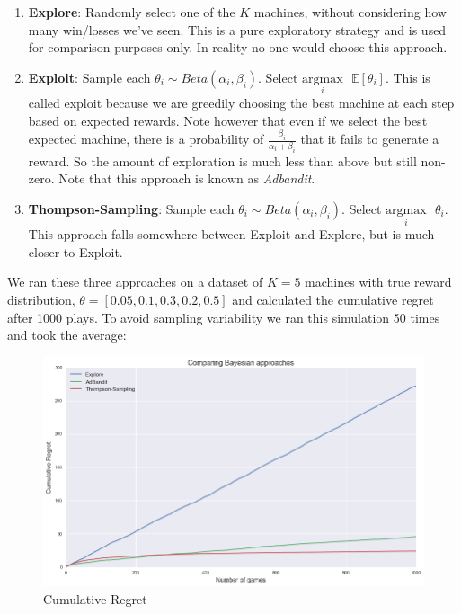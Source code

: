 \documentclass{article}
\begin{document}
\begin{enumerate}
\item \textbf{Explore}: Randomly select one of the $K$ machines, without considering how many win/losses we've seen. This is a pure exploratory strategy and is used for comparison purposes only. In reality no one would choose this approach.
\item \textbf{Exploit}: Sample each $\theta_i \sim Beta(\alpha_i, \beta_i)$. Select $\underset{i}{\text{argmax}}\text{ }\mathbb{E}[\theta_i]$. This is called exploit because we are greedily choosing the best machine at each step based on expected rewards. Note however that even if we select the best expected machine, there is a probability of $\frac{\beta_i}{\alpha_i + \beta_i}$ that it fails to generate a reward. So the amount of exploration is much less than above but still non-zero. Note that this approach is known as \textit{Adbandit}.
\item \textbf{Thompson-Sampling}: Sample each $\theta_i \sim Beta(\alpha_i, \beta_i)$. Select $\underset{i}{\text{argmax}}\text{ }\theta_i$. This approach falls somewhere between Exploit and Explore, but is much closer to Exploit. 
\end{enumerate}

We ran these three approaches on a dataset of $K=5$ machines with true reward distribution, $\theta = [0.05,0.1,0.3,0.2,0.5]$ and calculated the cumulative regret after 1000 plays. To avoid sampling variability we ran this simulation 50 times and took the average:

\begin{figure}[H]
\centering
\includegraphics[scale=0.4]{thompson_regret.png}
\caption{Cumulative Regret}
\end{figure}
\end{document}
